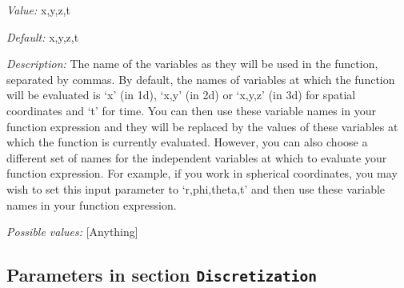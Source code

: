 \begin{itemize}
{\it Value:} x,y,z,t


{\it Default:} x,y,z,t


{\it Description:} The name of the variables as they will be used in the function, separated by commas. By default, the names of variables at which the function will be evaluated is `x' (in 1d), `x,y' (in 2d) or `x,y,z' (in 3d) for spatial coordinates and `t' for time. You can then use these variable names in your function expression and they will be replaced by the values of these variables at which the function is currently evaluated. However, you can also choose a different set of names for the independent variables at which to evaluate your function expression. For example, if you work in spherical coordinates, you may wish to set this input parameter to `r,phi,theta,t' and then use these variable names in your function expression.


{\it Possible values:} [Anything]
\end{itemize}

\subsection{Parameters in section \tt Discretization}
\label{parameters:Discretization}

